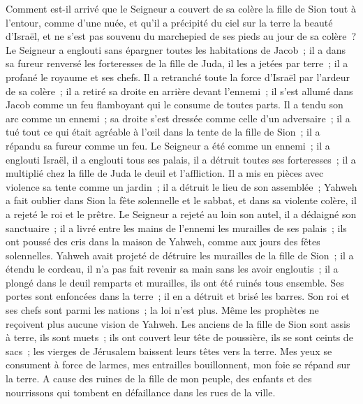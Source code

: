 \begin{multicols}{2}
\VerseOne{} Comment est-il arrivé que le Seigneur a couvert de sa colère la fille de Sion tout à l'entour, comme d'une nuée, et qu'il a précipité du ciel sur la terre la beauté d'Israël, et ne s'est pas souvenu du marchepied de ses pieds au jour de sa colère~?
 Le Seigneur a englouti sans épargner toutes les habitations de Jacob~; il a dans sa fureur renversé les forteresses de la fille de Juda, il les a jetées par terre~; il a profané le royaume et ses chefs.
 Il a retranché toute la force d'Israël par l'ardeur de sa colère~; il a retiré sa droite en arrière devant l'ennemi~; il s'est allumé dans Jacob comme un feu flamboyant qui le consume de toutes parts.
 Il a tendu son arc comme un ennemi~; sa droite s'est dressée comme celle d'un adversaire~; il a tué tout ce qui était agréable à l'œil dans la tente de la fille de Sion~; il a répandu sa fureur comme un feu.
 Le Seigneur a été comme un ennemi~; il a englouti Israël, il a englouti tous ses palais, il a détruit toutes ses forteresses~; il a multiplié chez la fille de Juda le deuil et l'affliction.
 Il a mis en pièces avec violence sa tente comme un jardin~; il a détruit le lieu de son assemblée~; Yahweh a fait oublier dans Sion la fête solennelle et le sabbat, et dans sa violente colère, il a rejeté le roi et le prêtre.
 Le Seigneur a rejeté au loin son autel, il a dédaigné son sanctuaire~; il a livré entre les mains de l'ennemi les murailles de ses palais~; ils ont poussé des cris dans la maison de Yahweh, comme aux jours des fêtes solennelles.
 Yahweh avait projeté de détruire les murailles de la fille de Sion~; il a étendu le cordeau, il n'a pas fait revenir sa main sans les avoir engloutis~; il a plongé dans le deuil remparts et murailles, ils ont été ruinés tous ensemble.
 Ses portes sont enfoncées dans la terre~; il en a détruit et brisé les barres. Son roi et ses chefs sont parmi les nations~; la loi n'est plus. Même les prophètes ne reçoivent plus aucune vision de Yahweh.
 Les anciens de la fille de Sion sont assis à terre, ils sont muets~; ils ont couvert leur tête de poussière, ils se sont ceints de sacs~; les vierges de Jérusalem baissent leurs têtes vers la terre.
 Mes yeux se consument à force de larmes, mes entrailles bouillonnent, mon foie se répand sur la terre. A cause des ruines de la fille de mon peuple, des enfants et des nourrissons qui tombent en défaillance dans les rues de la ville.

\end{multicols}
